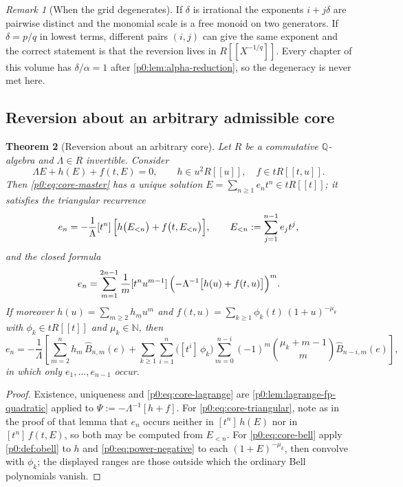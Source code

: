 \documentclass[11pt,a4paper,oneside]{book}
\theoremstyle{plain}
\newtheorem{theorem}{Theorem}[chapter]
\theoremstyle{definition}
\theoremstyle{remark}
\newtheorem{remark}[theorem]{Remark}
\newcommand{\Nat}{\mathbb{N}}
\newcommand{\Rat}{\mathbb{Q}}
\newcommand{\Coef}[1]{[#1]\,}
\newcommand{\OB}{\widehat{B}}
\begin{document}
\begin{remark}[When the grid degenerates]\label{p0:rem:grid}
If $\delta$ is irrational the exponents $i+j\delta$ are pairwise distinct and
the monomial scale is a free monoid on two generators.  If $\delta=p/q$ in
lowest terms, different pairs $(i,j)$ can give the same exponent and the
correct statement is that the reversion lives in $R[[X^{-1/q}]]$.  Every
chapter of this volume has $\delta/\alpha=1$ after
\cref{p0:lem:alpha-reduction}, so the degeneracy is never met here.
\end{remark}

\subsection{Reversion about an arbitrary admissible core}

\begin{theorem}[Reversion about an arbitrary core]\label{p0:thm:core-reversion}
Let $R$ be a commutative $\Rat$-algebra and $\Lambda\in R$ invertible.  Consider
\begin{equation}\label{p0:eq:core-master}
 \Lambda E+h(E)+f(t,E)=0,
 \qquad h\in u^2R[[u]],\quad f\in tR[[t,u]] .
\end{equation}
Then \eqref{p0:eq:core-master} has a unique solution
$E=\sum_{n\ge1}e_nt^n\in tR[[t]]$; it satisfies the triangular recurrence
\begin{equation}\label{p0:eq:core-triangular}
 e_n=-\frac1\Lambda\Coef{t^n}
   \Bigl[h\bigl(E_{<n}\bigr)+f\bigl(t,E_{<n}\bigr)\Bigr],
 \qquad E_{<n}:=\sum_{j=1}^{n-1}e_jt^j ,
\end{equation}
and the closed formula
\begin{equation}\label{p0:eq:core-lagrange}
 e_n=\sum_{m=1}^{2n-1}\frac1m
   \Coef{t^nu^{m-1}}\Bigl(-\Lambda^{-1}\bigl[h(u)+f(t,u)\bigr]\Bigr)^{m}.
\end{equation}
If moreover $h(u)=\sum_{m\ge2}h_mu^m$ and
$f(t,u)=\sum_{k\ge1}\phi_k(t)\,(1+u)^{-\mu_k}$ with $\phi_k\in tR[[t]]$ and
$\mu_k\in\Nat$, then
\begin{equation}\label{p0:eq:core-bell}
 e_n=-\frac1\Lambda\left[
  \sum_{m=2}^{n}h_m\,\OB_{n,m}(e)
  +\sum_{k\ge1}\sum_{i=1}^{n}\bigl(\Coef{t^i}\phi_k\bigr)
    \sum_{m=0}^{n-i}(-1)^m\binom{\mu_k+m-1}{m}\OB_{n-i,m}(e)
 \right],
\end{equation}
in which only $e_1,\dots,e_{n-1}$ occur.
\end{theorem}

\begin{proof}
Existence, uniqueness and \eqref{p0:eq:core-lagrange} are
\cref{p0:lem:lagrange-fp-quadratic} applied to $\Psi:=-\Lambda^{-1}[h+f]$.
For \eqref{p0:eq:core-triangular}, note as in the proof of that lemma that
$e_n$ occurs neither in $\Coef{t^n}h(E)$ nor in $\Coef{t^n}f(t,E)$, so both may
be computed from $E_{<n}$.  For \eqref{p0:eq:core-bell} apply
\cref{p0:def:obell} to $h$ and \eqref{p0:eq:power-negative} to each
$(1+E)^{-\mu_k}$, then convolve with $\phi_k$; the displayed ranges are those
outside which the ordinary Bell polynomials vanish.
\end{proof}
\end{document}

